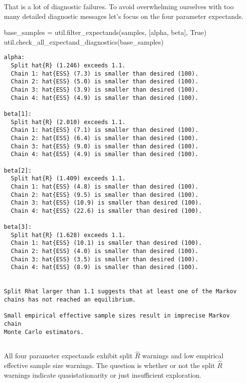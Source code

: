 \documentclass[
  letterpaper,
  DIV=11,
  numbers=noendperiod]{scrartcl}
\newenvironment{Shaded}{\begin{snugshade}}{\end{snugshade}}
\newcommand{\NormalTok}[1]{\textcolor[rgb]{0.00,0.23,0.31}{#1}}
\newcommand{\OperatorTok}[1]{\textcolor[rgb]{0.37,0.37,0.37}{#1}}
\newcommand{\StringTok}[1]{\textcolor[rgb]{0.13,0.47,0.30}{#1}}
\newcommand{\VariableTok}[1]{\textcolor[rgb]{0.07,0.07,0.07}{#1}}
\begin{document}
That is a lot of diagnostic failures. To avoid overwhelming ourselves
with too many detailed diagnostic messages let's focus on the four
parameter expectands.

\begin{Shaded}
\begin{Highlighting}[]
\NormalTok{base\_samples }\OperatorTok{=}\NormalTok{ util.filter\_expectands(samples, [}\StringTok{\textquotesingle{}alpha\textquotesingle{}}\NormalTok{, }\StringTok{\textquotesingle{}beta\textquotesingle{}}\NormalTok{], }\VariableTok{True}\NormalTok{)}
\NormalTok{util.check\_all\_expectand\_diagnostics(base\_samples)}
\end{Highlighting}
\end{Shaded}

\begin{verbatim}
alpha:
  Split hat{R} (1.246) exceeds 1.1.
  Chain 1: hat{ESS} (7.3) is smaller than desired (100).
  Chain 2: hat{ESS} (5.0) is smaller than desired (100).
  Chain 3: hat{ESS} (3.9) is smaller than desired (100).
  Chain 4: hat{ESS} (4.9) is smaller than desired (100).

beta[1]:
  Split hat{R} (2.010) exceeds 1.1.
  Chain 1: hat{ESS} (7.1) is smaller than desired (100).
  Chain 2: hat{ESS} (6.4) is smaller than desired (100).
  Chain 3: hat{ESS} (9.0) is smaller than desired (100).
  Chain 4: hat{ESS} (4.9) is smaller than desired (100).

beta[2]:
  Split hat{R} (1.409) exceeds 1.1.
  Chain 1: hat{ESS} (4.8) is smaller than desired (100).
  Chain 2: hat{ESS} (9.5) is smaller than desired (100).
  Chain 3: hat{ESS} (10.9) is smaller than desired (100).
  Chain 4: hat{ESS} (22.6) is smaller than desired (100).

beta[3]:
  Split hat{R} (1.628) exceeds 1.1.
  Chain 1: hat{ESS} (10.1) is smaller than desired (100).
  Chain 2: hat{ESS} (4.0) is smaller than desired (100).
  Chain 3: hat{ESS} (3.5) is smaller than desired (100).
  Chain 4: hat{ESS} (8.9) is smaller than desired (100).


Split Rhat larger than 1.1 suggests that at least one of the Markov
chains has not reached an equilibrium.
 
Small empirical effective sample sizes result in imprecise Markov chain
Monte Carlo estimators.
 
\end{verbatim}

All four parameter expectands exhibit split \(\hat{R}\) warnings and low
empirical effective sample size warnings. The question is whether or not
the split \(\hat{R}\) warnings indicate quasistationarity or just
insufficient exploration.
\end{document}
